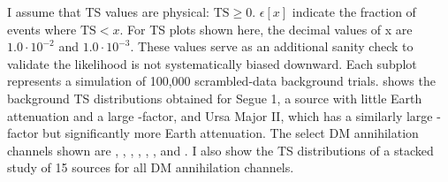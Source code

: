 I assume that TS values are physical: $ \mathrm{TS} \ge 0 $.
$\epsilon[x] $ indicate the fraction of events where $ \mathrm{TS} < x $. For TS plots shown here, the decimal values of x are $1.0 \cdot 10^{-2}$ and $1.0 \cdot 10^{-3}$.
These values serve as an additional sanity check to validate the likelihood is not systematically biased downward.
Each subplot represents a simulation of 100,000 scrambled-data background trials.
 shows the background TS distributions obtained for Segue 1, a source with little Earth attenuation and a large \J-factor, and Ursa Major II, which has a similarly large \J-factor but significantly more Earth attenuation.
The select DM annihilation channels shown are , , \parpar{\mu}, \parpar{\tau}, , \parpar{\nu_\mu}, and \parpar{\nu_\tau}.
I also show the TS distributions of a stacked study of 15 sources for all DM annihilation channels.

